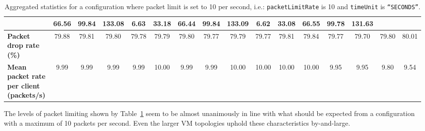 \begin{table}[!h]
{\begin{tabular}{|l|ccccc|ccccc|ccccc|}
            & \multicolumn{1}{c|}{66.56}
            & \multicolumn{1}{c|}{99.84}
            & \multicolumn{1}{c|}{133.08}
            & \multicolumn{1}{c|}{6.63}
            & \multicolumn{1}{c|}{33.18}
            & \multicolumn{1}{c|}{66.44}
            & \multicolumn{1}{c|}{99.84}
            & \multicolumn{1}{c|}{133.09}
            & \multicolumn{1}{c|}{6.62}
            & \multicolumn{1}{c|}{33.08}
            & \multicolumn{1}{c|}{66.55}
            & \multicolumn{1}{c|}{99.78}
            & \multicolumn{1}{c|}{131.63}
            \\ \hline
            \textbf{Packet drop rate (\%)} & \multicolumn{1}{c|}{79.88} & \multicolumn{1}{c|}{79.81}
            & \multicolumn{1}{c|}{79.80}
            & \multicolumn{1}{c|}{79.78}
            & \multicolumn{1}{c|}{79.79}
            & \multicolumn{1}{c|}{79.80}
            & \multicolumn{1}{c|}{79.77}
            & \multicolumn{1}{c|}{79.79}
            & \multicolumn{1}{c|}{79.77}
            & \multicolumn{1}{c|}{79.81}
            & \multicolumn{1}{c|}{79.84}
            & \multicolumn{1}{c|}{79.77}
            & \multicolumn{1}{c|}{79.70}
            & \multicolumn{1}{c|}{79.80}
            & \multicolumn{1}{c|}{80.01}
            \\ \hline
            \textbf{Mean packet rate per client (packets/s)} & \multicolumn{1}{c|}{9.99} & \multicolumn{1}{c|}{9.99}
            & \multicolumn{1}{c|}{9.99}
            & \multicolumn{1}{c|}{9.99}
            & \multicolumn{1}{c|}{10.00}
            & \multicolumn{1}{c|}{9.99}
            & \multicolumn{1}{c|}{9.99}
            & \multicolumn{1}{c|}{10.00}
            & \multicolumn{1}{c|}{10.00}
            & \multicolumn{1}{c|}{10.00}
            & \multicolumn{1}{c|}{10.00}
            & \multicolumn{1}{c|}{9.95}
            & \multicolumn{1}{c|}{9.95}
            & \multicolumn{1}{c|}{9.80}
            & \multicolumn{1}{c|}{9.54}
            \\ \hline
        \end{tabular}
    }
    \caption{Aggregated statistics for a configuration where packet limit is set to 10 per second, i.e.:
    \texttt{packetLimitRate} is 10 and \texttt{timeUnit} is \texttt{``SECONDS''}.}
    \label{table:analysis_results_limit}
\end{table}

The levels of packet limiting shown by Table~\ref{table:analysis_results_limit} seem to be almost unanimously in
line with what should be expected from a configuration with a maximum of 10 packets per second. Even the larger VM
topologies uphold these characteristics by-and-large.

